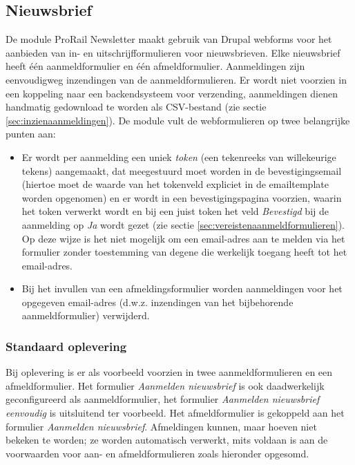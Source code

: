 \subsection{Nieuwsbrief}

De module ProRail Newsletter maakt gebruik van Drupal webforms voor het aanbieden 
van in- en uitschrijfformulieren voor nieuwsbrieven. Elke nieuwsbrief heeft 
\'{e}\'{e}n aanmeldformulier en \'{e}\'{e}n afmeldformulier. Aanmeldingen zijn 
eenvoudigweg inzendingen van de aanmeldformulieren. Er wordt niet voorzien in een 
koppeling naar een backendsysteem voor verzending, aanmeldingen dienen handmatig 
gedownload te worden als CSV-bestand (zie sectie \ref{sec:inzienaanmeldingen}). 
De module vult de webformulieren op twee belangrijke punten aan:

\begin{itemize}
\item Er wordt per aanmelding een uniek \emph{token} (een tekenreeks van 
willekeurige tekens) aangemaakt, dat meegestuurd moet worden in de 
bevestigingsemail (hiertoe moet de waarde van het tokenveld expliciet in de emailtemplate worden opgenomen) en er wordt in een bevestigingspagina voorzien, waarin 
het token verwerkt wordt en bij een juist token het veld \emph{Bevestigd} bij de aanmelding op 
\emph{Ja} wordt gezet (zie sectie \ref{sec:vereistenaanmeldformulieren}).
Op deze wijze is het niet mogelijk om een email-adres aan te melden via het 
formulier zonder toestemming van degene die werkelijk toegang heeft tot het 
email-adres. 
\item Bij het invullen van een afmeldingsformulier worden aanmeldingen voor het opgegeven 
email-adres (d.w.z. inzendingen van het bijbehorende aanmeldformulier) verwijderd.
\end{itemize}

\subsubsection{Standaard oplevering}
Bij oplevering is er als voorbeeld voorzien in twee aanmeldformulieren en een 
afmeldformulier. Het formulier \emph{Aanmelden nieuwsbrief} is ook daadwerkelijk 
geconfigureerd als aanmeldformulier, het formulier \emph{Aanmelden nieuwsbrief 
eenvoudig} is uitsluitend ter voorbeeld. Het afmeldformulier is gekoppeld aan 
het formulier \emph{Aanmelden nieuwsbrief}.
Afmeldingen kunnen, maar hoeven niet bekeken te worden; ze worden automatisch 
verwerkt, mits voldaan is aan de voorwaarden voor aan- en afmeldformulieren 
zoals hieronder opgesomd.  

